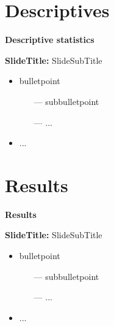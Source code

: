 \documentclass{beamer} %
\begin{document}
\section{Descriptives}
{
	\begin{frame}[plain]		
    	\vspace{1cm}
    	{\color{white}\LARGE \textbf{Descriptive statistics}}
    \end{frame}
    \addtocounter{framenumber}{-1}
}


\begin{frame}[label=descr]{\textbf{SlideTitle:} SlideSubTitle}
	\begin{itemize}
	    \item bulletpoint
    	\begin{itemize}
    	    \item[---] subbulletpoint
    	    \item[---] ...
    	\end{itemize}
    	\item ...
	\end{itemize}
	\hspace{\fill}\hyperlink{appendix}{}
\end{frame}

\section{Results}
{
	\begin{frame}[plain]		
		\vspace{1cm}
		{\color{white}\LARGE \textbf{Results}}
	\end{frame}
	\addtocounter{framenumber}{-1}
}

\begin{frame}{\textbf{SlideTitle:} SlideSubTitle}
	\begin{itemize}
	    \item bulletpoint
    	\begin{itemize}
    	    \item[---] subbulletpoint
    	    \item[---] ...
    	\end{itemize}
    	\item ...
	\end{itemize}
\end{frame}
\end{document}
